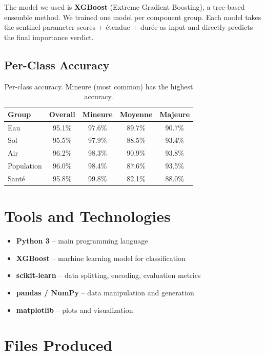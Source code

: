 \documentclass[12pt,a4paper]{article}
\begin{document}
The model we used is \textbf{XGBoost} (Extreme Gradient Boosting), a tree-based ensemble method. We trained one model per component group. Each model takes the sentinel parameter scores + \'etendue + dur\'ee as input and directly predicts the final importance verdict.

\subsection{Per-Class Accuracy}

\begin{table}[H]
\centering
\begin{tabular}{lcccc}
\toprule
\textbf{Group} & \textbf{Overall} & \textbf{Mineure} & \textbf{Moyenne} & \textbf{Majeure} \\
\midrule
Eau & 95.1\% & 97.6\% & 89.7\% & 90.7\% \\
Sol & 95.5\% & 97.9\% & 88.5\% & 93.4\% \\
Air & 96.2\% & 98.3\% & 90.9\% & 93.8\% \\
Population & 96.0\% & 98.4\% & 87.6\% & 93.5\% \\
Sant\'e & 95.8\% & 99.8\% & 82.1\% & 88.0\% \\
\bottomrule
\end{tabular}
\caption{Per-class accuracy. Mineure (most common) has the highest accuracy.}
\end{table}

\section{Tools and Technologies}

\begin{itemize}
    \item \textbf{Python 3} -- main programming language
    \item \textbf{XGBoost} -- machine learning model for classification
    \item \textbf{scikit-learn} -- data splitting, encoding, evaluation metrics
    \item \textbf{pandas / NumPy} -- data manipulation and generation
    \item \textbf{matplotlib} -- plots and visualization
\end{itemize}

\section{Files Produced}
\end{document}
